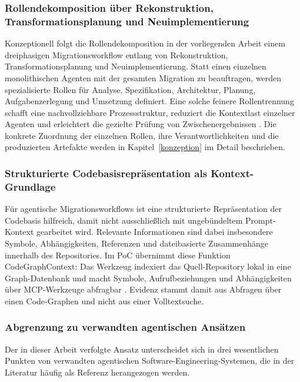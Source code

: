 \subsubsection{Rollendekomposition über Rekonstruktion, Transformationsplanung und Neuimplementierung}

Konzeptionell folgt die Rollendekomposition in der vorliegenden Arbeit einem dreiphasigen Migrationsworkflow entlang von Rekonstruktion, Transformationsplanung und Neuimplementierung. Statt einen einzelnen monolithischen Agenten mit der gesamten Migration zu beauftragen, werden spezialisierte Rollen für Analyse, Spezifikation, Architektur, Planung, Aufgabenzerlegung und Umsetzung definiert. Eine solche feinere Rollentrennung schafft eine nachvollziehbare Prozessstruktur, reduziert die Kontextlast einzelner Agenten und erleichtert die gezielte Prüfung von Zwischenergebnissen \parencite{boeckeler2026contextengineering,qian2024chatdev}. Die konkrete Zuordnung der einzelnen Rollen, ihre Verantwortlichkeiten und die produzierten Artefakte werden in Kapitel~\ref{konzeption} im Detail beschrieben.
\subsubsection{Strukturierte Codebasisrepräsentation als Kontext-Grundlage}

Für agentische Migrationsworkflows ist eine strukturierte Repräsentation der Codebasis hilfreich, damit nicht ausschließlich mit ungebündeltem Prompt-Kontext gearbeitet wird. Relevante Informationen sind dabei insbesondere Symbole, Abhängigkeiten, Referenzen und dateibasierte Zusammenhänge innerhalb des Repositories. Im PoC übernimmt diese Funktion CodeGraphContext: Das Werkzeug indexiert das Quell-Repository lokal in eine Graph-Datenbank und macht Symbole, Aufrufbeziehungen und Abhängigkeiten über MCP-Werkzeuge abfragbar \parencite{codegraphcontext}. Evidenz stammt damit aus Abfragen über einen Code-Graphen und nicht aus einer Volltextsuche.

\subsubsection{Abgrenzung zu verwandten agentischen Ansätzen}

Der in dieser Arbeit verfolgte Ansatz unterscheidet sich in drei wesentlichen Punkten von verwandten agentischen Software-Engineering-Systemen, die in der Literatur häufig als Referenz herangezogen werden.

